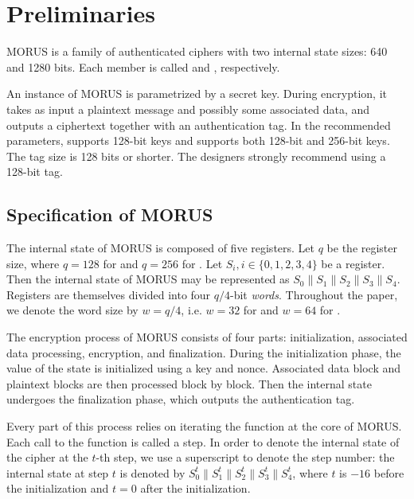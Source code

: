 
\section{Preliminaries}
\label{sec/Preliminaries}

MORUS \cite{MORUS} is a family of authenticated ciphers with two internal state sizes: 640 and 1280 bits.
Each member is called  and , respectively.

An instance of MORUS is parametrized by a secret key. During encryption, it takes as input a plaintext message and possibly some associated data, and outputs a ciphertext together with an authentication tag.
In the recommended parameters,  supports 128-bit keys and  supports both 128-bit and 256-bit keys. The tag size is 128 bits or shorter. The designers strongly recommend using a 128-bit tag.

\subsection{Specification of MORUS}
\label{subsec/Spec}

The internal state of MORUS is composed of five registers. Let $q$ be the register size, where $q = 128$ for  and $q=256$ for . Let $S_i, i \in\{0,1,2,3,4\}$ be a register. Then the internal state of MORUS may be represented as $S_0\|S_1\|S_2\|S_3\|S_4$.
Registers are themselves divided into four $q/4$-bit \emph{words}.
Throughout the paper, we denote the word size by $w = q/4$, i.e. $w=32$ for  and $w=64$ for .

The encryption process of MORUS consists of four parts: initialization, associated data processing, encryption, and finalization. 
During the initialization phase, the value of the state is initialized using a key and nonce.
Associated data block and plaintext blocks are then processed block by block.
Then the internal state undergoes the finalization phase, which outputs the authentication tag.

Every part of this process relies on iterating the \StateUpdate{} function at the core of MORUS. Each call to the \StateUpdate{} function is called a step.
In order to denote the internal state of the cipher at the $t$-th step, we use a superscript to denote the step number: the internal state at step $t$ is denoted by $S^t_0\|S^t_1\|S^t_2\|S^t_3\|S^t_4$, where $t$ is $-16$ before the initialization and $t=0$ after the initialization.


